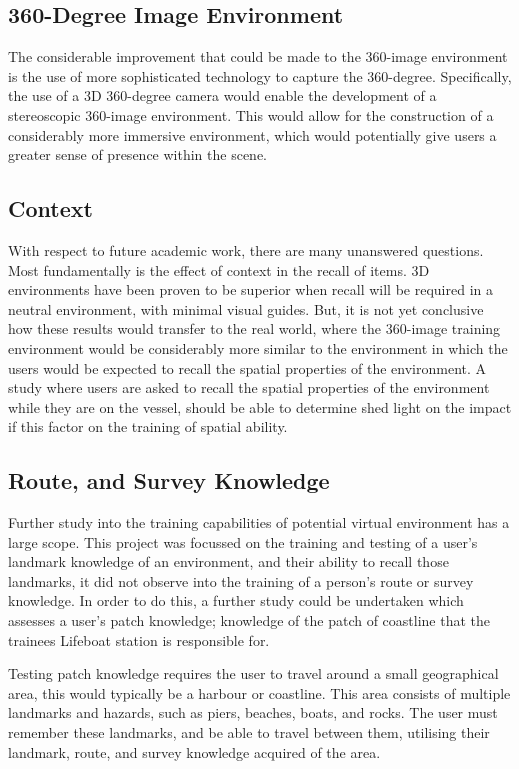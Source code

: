\documentclass[ %
                    author={Elis Jones},
                supervisor={Dr. Kirsten Cater},
                    degree={BSc},
                     title={The Effect of Presentation Medium on Spatial Cognition},
                  subtitle={in the Virtual Environment},
                      year={2018} ]{dissertation}
\begin{document}
\subsection{360-Degree Image Environment}
The considerable improvement that could be made to the 360-image environment is the use of more sophisticated technology to capture the 360-degree. Specifically, the use of a 3D 360-degree camera would enable the development of a stereoscopic 360-image environment. This would allow for the construction of a considerably more immersive environment, which would potentially give users a greater sense of presence within the scene. 

\subsection{Context}\label{further-context}
With respect to future academic work, there are many unanswered questions. Most fundamentally is the effect of context in the recall of items. 3D environments have been proven to be superior when recall will be required in a neutral environment, with minimal visual guides. But, it is not yet conclusive how these results would transfer to the real world, where the 360-image training environment would be considerably more similar to the environment in which the users would be expected to recall the spatial properties of the environment. A study where users are asked to recall the spatial properties of the environment while they are on the vessel, should be able to determine shed light on the impact if this factor on the training of spatial ability. 

\subsection{Route, and Survey Knowledge}
Further study into the training capabilities of potential virtual environment has a large scope. This project was focussed on the training and testing of a user's landmark knowledge of an environment, and their ability to recall those landmarks, it did not observe into the training of a person's route or survey knowledge. In order to do this, a further study could be undertaken which assesses a user's patch knowledge; knowledge of the patch of coastline that the trainees Lifeboat station is responsible for.

Testing patch knowledge requires the user to travel around a small geographical area, this would typically be a harbour or coastline. This area consists of multiple landmarks and hazards, such as piers, beaches, boats, and rocks. The user must remember these landmarks, and be able to travel between them, utilising their landmark, route, and survey knowledge acquired of the area. 
\end{document}
